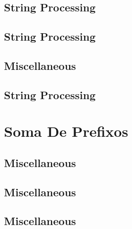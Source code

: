 \subsection{String Processing}
\raggedbottom
\vspace{-.7\baselineskip}\hrulefill
\vspace{0.1\baselineskip}\subsection{String Processing}
\raggedbottom
\vspace{-.7\baselineskip}\hrulefill
\vspace{0.1\baselineskip}\subsection{Miscellaneous}
\raggedbottom
\vspace{-.7\baselineskip}\hrulefill
\vspace{0.1\baselineskip}\subsection{String Processing}
\raggedbottom
\vspace{-.7\baselineskip}\hrulefill
\vspace{0.1\baselineskip}
\section{Soma De Prefixos}
\subsection{Miscellaneous}
\raggedbottom
\vspace{-.7\baselineskip}\hrulefill
\vspace{0.1\baselineskip}\subsection{Miscellaneous}
\raggedbottom
\vspace{-.7\baselineskip}\hrulefill
\vspace{0.1\baselineskip}\subsection{Miscellaneous}
\raggedbottom
\vspace{-.7\baselineskip}\hrulefill
\vspace{0.1\baselineskip}
